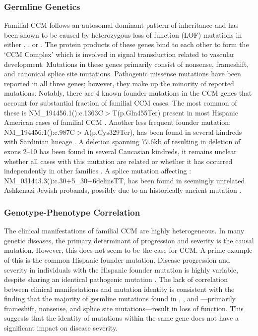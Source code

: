 \subsubsection{Germline Genetics}
Familial CCM follows an autosomal dominant pattern of inheritance \citep{bicknell1978, clark1970, kidd1947} and has been shown to be caused by heterozygous loss of function (LOF) mutations in either  \citep{labergelecouteulx1999, sahoo1999},  \citep{liquori2003, denier2004}, or  \citep{bergametti2005}. The protein products of these genes bind to each other to form the `CCM Complex' which is involved in signal transduction related to vascular development. Mutations in these genes primarily consist of nonsense, frameshift, and canonical splice site mutations. Pathogenic missense mutations have been reported in all three genes; however, they make up the minority of reported mutations. Notably, there are 4 known founder mutations in the CCM genes that account for substantial fraction of familial CCM cases. The most common of these is NM\_194456.1():c.1363C$>$T(p.Gln455Ter) present in most Hispanic American cases of familial CCM \citep{gunel1996, sahoo1999}. Another less frequent  founder mutation: NM\_194456.1():c.987C$>$A(p.Cys329Ter), has been found in several kindreds with Sardinian lineage \citep{cau2009}. A deletion spanning 77.6kb of  resulting in deletion of exons 2--10 has been found in several Caucasian kindreds, it remains unclear whether all cases with this mutation are related or whether it has occurred independently in other families \citep{liquori2007}. A splice mutation affecting : NM\_031443.3():c.30+5\_30+6delinsTT, has been found in seemingly unrelated Ashkenazi Jewish probands, possibly due to an historically ancient mutation \citep{gallione2011}.

\subsubsection{Genotype-Phenotype Correlation}
The clinical manifestations of familial CCM are highly heterogeneous. In many genetic diseases, the primary determinant of progression and severity is the causal mutation. However, this does not seem to be the case for CCM. A prime example of this is the common Hispanic founder mutation. Disease progression and severity in individuals with the Hispanic founder mutation is highly variable, despite sharing an identical pathogenic mutation \citep{gault2006, laurans2003, denier2004, gianfrancesco2007}. The lack of correlation between clinical manifestations and mutation identity is consistent with the finding that the majority of germline mutations found in , , and ---primarily frameshift, nonsense, and splice site mutations---result in loss of function. This suggests that the identity of mutations within the same gene does not have a significant impact on disease severity.

